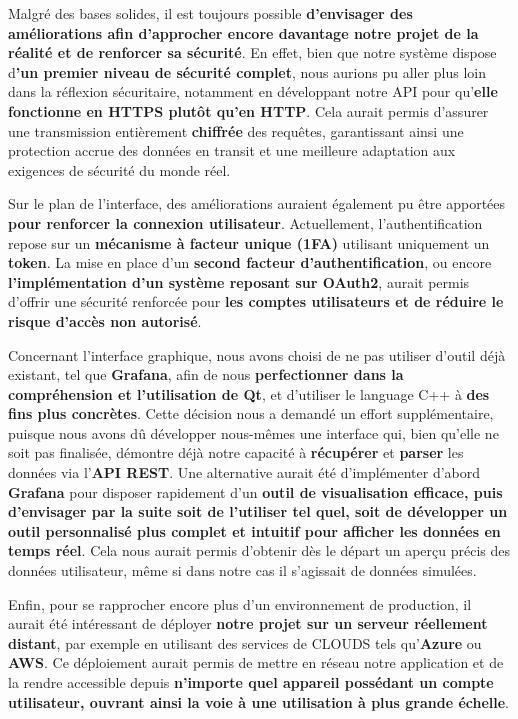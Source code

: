 \documentclass[10pt, a4paper]{report}
\begin{document}
	Malgré des bases solides, il est toujours possible \textbf{d’envisager des améliorations afin d’approcher encore davantage notre projet de la réalité et de renforcer sa sécurité}. En effet, bien que notre système dispose d\textbf{’un premier niveau de sécurité complet}, nous aurions pu aller plus loin dans la réflexion sécuritaire, notamment en développant notre API pour qu’\textbf{elle fonctionne en HTTPS plutôt qu’en HTTP}. Cela aurait permis d’assurer une transmission entièrement \textbf{chiffrée} des requêtes, garantissant ainsi une protection accrue des données en transit et une meilleure adaptation aux exigences de sécurité du monde réel.
	
	Sur le plan de l’interface, des améliorations auraient également pu être apportées \textbf{pour renforcer la connexion utilisateur}. Actuellement, l’authentification repose sur un \textbf{mécanisme à facteur unique (1FA)} utilisant uniquement un \textbf{token}. La mise en place d’un\textbf{ second facteur d’authentification}, ou encore \textbf{l’implémentation d’un système reposant sur OAuth2}, aurait permis d’offrir une sécurité renforcée pour \textbf{les comptes utilisateurs et de réduire le risque d’accès non autorisé}.
	
	Concernant l’interface graphique, nous avons choisi de ne pas utiliser d’outil déjà existant, tel que \textbf{Grafana}, afin de nous \textbf{perfectionner dans la compréhension et l’utilisation de Qt}, et d'utiliser le language C++ à \textbf{des fins plus concrètes}. Cette décision nous a demandé un effort supplémentaire, puisque nous avons dû développer nous-mêmes une interface qui, bien qu’elle ne soit pas finalisée, démontre déjà notre capacité à \textbf{récupérer} et \textbf{parser} les données via l’\textbf{API REST}. Une alternative aurait été d’implémenter d’abord \textbf{Grafana} pour disposer rapidement d’un \textbf{outil de visualisation efficace, puis d’envisager par la suite soit de l’utiliser tel quel, soit de développer un outil personnalisé plus complet et intuitif pour afficher les données en temps réel}. Cela nous aurait permis d’obtenir dès le départ un aperçu précis des données utilisateur, même si dans notre cas il s’agissait de données simulées.
	
	Enfin, pour se rapprocher encore plus d’un environnement de production, il aurait été intéressant de déployer \textbf{notre projet sur un serveur réellement distant}, par exemple en utilisant des services de CLOUDS tels qu’\textbf{Azure} ou \textbf{AWS}. Ce déploiement aurait permis de mettre en réseau notre application et de la rendre accessible depuis \textbf{n’importe quel appareil possédant un compte utilisateur, ouvrant ainsi la voie à une utilisation à plus grande échelle}. 
	
\end{document}
